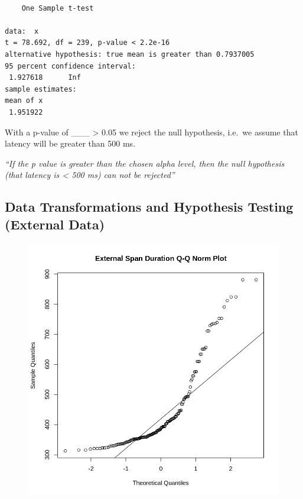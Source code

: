 \documentclass[
  letterpaper,
  DIV=11,
  numbers=noendperiod]{scrartcl}
\newenvironment{Shaded}{\begin{snugshade}}{\end{snugshade}}
\newcommand{\AttributeTok}[1]{\textcolor[rgb]{0.40,0.45,0.13}{#1}}
\newcommand{\FunctionTok}[1]{\textcolor[rgb]{0.28,0.35,0.67}{#1}}
\newcommand{\NormalTok}[1]{\textcolor[rgb]{0.00,0.23,0.31}{#1}}
\newcommand{\SpecialCharTok}[1]{\textcolor[rgb]{0.37,0.37,0.37}{#1}}
\newcommand{\StringTok}[1]{\textcolor[rgb]{0.13,0.47,0.30}{#1}}
\begin{document}
\begin{verbatim}

    One Sample t-test

data:  x
t = 78.692, df = 239, p-value < 2.2e-16
alternative hypothesis: true mean is greater than 0.7937005
95 percent confidence interval:
 1.927618      Inf
sample estimates:
mean of x 
 1.951922 
\end{verbatim}

With a p-value of \_\_\_ \textgreater{} 0.05 we reject the null
hypothesis, i.e.~we assume that latency will be greater than 500 ms.

\emph{``If the p value is greater than the chosen alpha level, then the
null hypothesis (that latency is \textless{} 500 ms) can not be
rejected''}

\hypertarget{data-transformations-and-hypothesis-testing-external-data}{%
\subsection{Data Transformations and Hypothesis Testing (External
Data)}\label{data-transformations-and-hypothesis-testing-external-data}}

\begin{Shaded}
\end{Shaded}

\begin{figure}[H]

{\centering \includegraphics{dss-span-analysis-rev5_files/figure-pdf/cell-71-output-1.png}

}

\end{figure}
\end{document}
